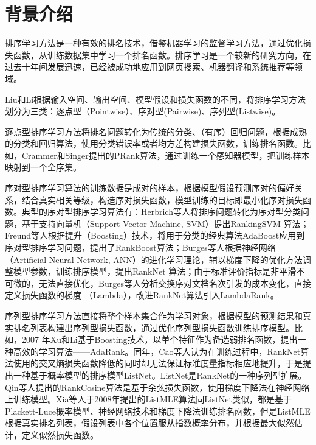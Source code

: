 \ornamento
\section{背景介绍}
排序学习方法是一种有效的排名技术，借鉴机器学习的监督学习方法，通过优化损失函数，从训练数据集中学习一个排名函数。排序学习是一个较新的研究方向，在过去十年间发展迅速，已经被成功地应用到网页搜索、机器翻译和系统推荐等领域\cite{liu2009learning}。

Liu\cite{liu2011learning}和Li\cite{li2011learning}根据输入空间、输出空间、模型假设和损失函数的不同，将排序学习方法划分为三类：逐点型（Pointwise）、序对型(Pairwise)、序列型(Listwise)。

逐点型排序学习方法将排名问题转化为传统的分类、（有序）回归问题，根据成熟的分类和回归算法，使用分类错误率或者均方差构建损失函数，训练排名函数。比如，Crammer和Singer\cite{crammer2001pranking}提出的PRank算法，通过训练一个感知器模型，把训练样本映射到一个全序集。

序对型排序学习算法的训练数据是成对的样本，根据模型假设预测序对的偏好关系，结合真实相关等级，构造序对损失函数，模型训练的目标即最小化序对损失函数。典型的序对型排序学习算法有：Herbrich等人\cite{herbrich1999large}将排序问题转化为序对型分类问题，基于支持向量机（Support Vector Machine, SVM）提出RankingSVM 算法；Freund等人\cite{freund2003efficient}根据提升（Boosting）技术，将用于分类的经典算法AdaBoost应用到序对型排序学习问题，提出了RankBoost算法；Burges等人\cite{burges2005learning}根据神经网络（Artificial Neural Network, ANN）的进化学习理论，辅以梯度下降的优化方法调整模型参数，训练排序模型，提出RankNet 算法；由于标准评价指标是非平滑不可微的，无法直接优化，Burges等人\cite{burges2007learning}分析交换序对文档名次引发的成本变化，直接定义损失函数的梯度
（Lambda），改进RankNet算法引入LambdaRank。

序列型排序学习方法直接将整个样本集合作为学习对象，根据模型的预测结果和真实排名列表构建出序列型损失函数，通过优化序列型损失函数训练排序模型。比如，2007 年Xu和Li\cite{xu2007adarank}基于Boosting技术，以单个特征作为备选弱排名函数，提出一种高效的学习算法——AdaRank。同年，Cao等人\cite{cao2007learning}认为在训练过程中，RankNet算法使用的交叉熵损失函数降低的同时却无法保证标准度量指标相应地提升，于是提出一种基于概率模型的排序模型ListNet。ListNet是RankNet的一种序列型扩展。Qin等人\cite{qin2008query}提出的RankCosine算法是基于余弦损失函数，使用梯度下降法在神经网络上训练模型。Xia等人\cite{xia2008listwise}于2008年提出的ListMLE算法同ListNet类似，都是基于Plackett-Luce概率模型、神经网络技术和梯度下降法训练排名函数，但是ListMLE根据真实排名列表，假设列表中各个位置服从指数概率分布，并根据最大似然估计，定义似然损失函数。

